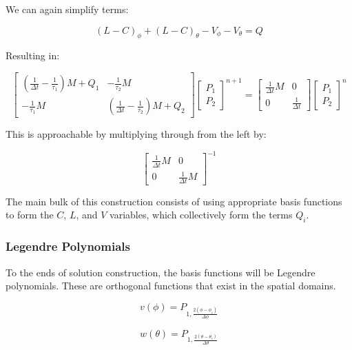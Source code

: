 \documentclass[12pt,a4paper,pagesize=pdftex]{scrartcl}
\begin{document}
{We can again simplify terms:

\begin{equation*}
    \left(L - C\right)_\phi + \left(L - C\right)_\theta - V_\phi - V_\theta = Q
\end{equation*}

Resulting in:

\begin{equation*}
    \begin{bmatrix}
        \left(\frac{1}{\Delta t} - \frac{1}{\tau_1}\right) M + Q_1 & -\frac{1}{\tau_2} M \\
        -\frac{1}{\tau_1}M & \left(\frac{1}{\Delta t} - \frac{1}{\tau_2}\right)M + Q_2
    \end{bmatrix}
    \begin{bmatrix}
        P_1 \\
        P_2
    \end{bmatrix}^{n+1}
    =
    \begin{bmatrix}
        \frac{1}{\Delta t} M & 0 \\
        0 & \frac{1}{\Delta t}
    \end{bmatrix}
    \begin{bmatrix}
        P_1 \\
        P_2
    \end{bmatrix}^n
\end{equation*}

This is approachable by multiplying through from the left by:

\begin{equation*}
    \begin{bmatrix}
        \frac{1}{\Delta t}M & 0 \\
        0 & \frac{1}{\Delta t} M
    \end{bmatrix}^{-1}
\end{equation*}

The main bulk of this construction consists of using appropriate basis functions to form the \(C\), \(L\), and \(V\) variables, which collectively form the terms \(Q_i\).

\subsubsection*{Legendre Polynomials}
To the ends of solution construction, the basis functions will be Legendre polynomials. These are orthogonal functions that exist in the spatial domains.

\begin{equation*}
    v\left(\phi\right) = P_{1, \frac{2\left(\phi - \phi_i\right)}{\Delta \phi}}
\end{equation*}

\begin{equation*}
    w\left(\theta\right) = P_{1, \frac{2\left(\theta - \theta_i\right)}{\Delta \theta}}
\end{equation*}
}
\end{document}
